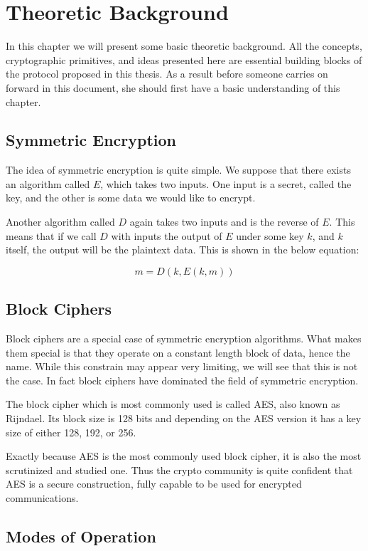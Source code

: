 \chapter{Theoretic Background}
\label{chapters:TheoreticBackground}

In this chapter we will present some basic theoretic background.
All the concepts, cryptographic primitives, and ideas presented here are essential building blocks of the protocol proposed in this thesis.
As a result before someone carries on forward in this document, she should first have a basic understanding of this chapter.

\section{Symmetric Encryption}

The idea of symmetric encryption is quite simple.
We suppose that there exists an algorithm called $E$, which takes two inputs.
One input is a secret, called the key, and the other is some data we would like to encrypt.

Another algorithm called $D$ again takes two inputs and is the reverse of $E$.
This means that if we call $D$ with inputs the output of $E$ under some key $k$, and $k$ itself, the output will be the plaintext data. This is shown in the below equation:

\[
  m = D(k, E(k, m))
\]

\section{Block Ciphers}

Block ciphers are a special case of symmetric encryption algorithms.
What makes them special is that they operate on a constant length block of data, hence the name.
While this constrain may appear very limiting, we will see that this is not the case.
In fact block ciphers have dominated the field of symmetric encryption.

The block cipher which is most commonly used is called AES, also known as Rijndael.
Its block size is 128 bits and depending on the AES version it has a key size of either 128, 192, or 256.

Exactly because AES is the most commonly used block cipher, it is also the most scrutinized and studied one.
Thus the crypto community is quite confident that AES is a secure construction, fully capable to be used for encrypted communications.

\section{Modes of Operation}

